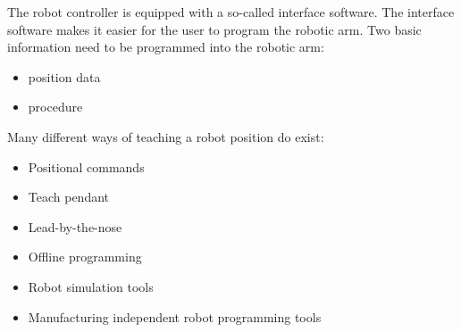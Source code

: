 The robot controller is equipped with a so-called interface software. The interface software makes it easier for the user to program the robotic arm.  
Two basic information need to be programmed into the robotic arm:

\begin{itemize}
    \item position data 
    \item procedure
\end{itemize}

Many different ways of teaching a robot position do exist:

\begin{itemize}
    \item Positional commands
    \item Teach pendant
    \item Lead-by-the-nose
    \item Offline programming
    \item Robot simulation tools
    \item Manufacturing independent robot programming tools
\end{itemize}